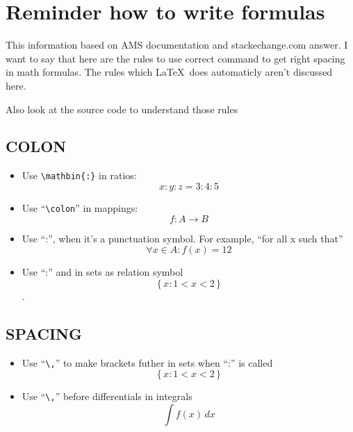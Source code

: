 \documentclass[a5paper,openany,9pt]{extbook}
\begin{document}
\chapter*{Reminder how to write formulas}

This information based on AMS documentation and stackechange.com answer. I want to say that here are the rules to use correct command to get right spacing in math formulas. The rules which \LaTeX\ does automaticly aren't discussed here.

Also look at the source code to understand those rules

\section{COLON}

\begin{itemize}
\item
Use \verb|\mathbin{:}| in ratios:
$$x\mathbin{:}y\mathbin{:}z = 3\mathbin{:}4\mathbin{:}5$$

\item
Use ``\verb=\colon='' in mappings:
$$f\colon A \to B$$

\item
Use ``:'', when it's a punctuation symbol. For example, ``for all x such that''
$$\forall x \in A\colon f(x) = 12$$

\item
Use ``:'' and in sets as relation symbol
$$\{\,x : 1 < x < 2\,\}$$.

\end{itemize}
	
\section{SPACING}

\begin{itemize}
\item
Use ``\verb=\,='' to make brackets futher in sets when ``:'' is called
$$\{\,x : 1 < x < 2\,\}$$
\item
Use ``\verb=\,='' before differentials in integrals
$$ \int f(x)\, dx$$
\end{itemize}

\newpage
\end{document}
